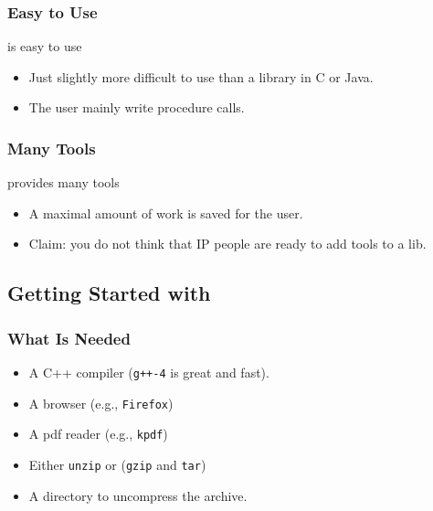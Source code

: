 \documentclass{beamer}
\begin{document}
\begin{frame}
  \frametitle{Easy to Use}

  \begin{block}{\mln is easy to use}
    \begin{itemize}
    \item Just slightly more difficult to use than a library in C or Java.
    \item The user mainly write procedure calls.
    \end{itemize}
  \end{block}


\end{frame}


\begin{frame}
  \frametitle{Many Tools}

  \begin{block}{\mln provides many tools}
    \begin{itemize}
    \item A maximal amount of work is saved for the user.
    \item Claim: you do not think that IP people are ready to add tools to a lib.
    \end{itemize}
  \end{block}


\end{frame}




\subsection{Getting Started with \mln}


\begin{frame}
  \frametitle{What Is Needed}

  \begin{itemize}
  \item A C++ compiler (\texttt{g++-4} is great and fast).
  \item A browser (e.g., \texttt{Firefox})
  \item A pdf reader (e.g., \texttt{kpdf})
  \item Either \texttt{unzip} or (\texttt{gzip} and \texttt{tar})
  \item A directory to uncompress the \mln archive.
  \end{itemize}

\end{frame}
\end{document}

